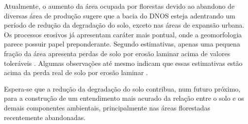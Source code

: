 Atualmente, o aumento da área ocupada por florestas devido ao abandono de diversas área de produção sugere que 
a bacia do DNOS esteja adentrando um período de redução da degradação do solo, exceto nas áreas de expansão 
urbana. Os processos erosivos já apresentam caráter mais pontual, onde a geomorfologia parece possuir papel 
preponderante. Segundo estimativas, apenas uma pequena fração da área apresenta perdas de solo por erosão 
laminar acima de valores toleráveis \cite{Miguel2010}. Algumas observações até mesmo indicam que essas 
estimativas estão acima da perda real de solo por erosão laminar \cite{MouraBueno2012}.


Espera-se que a redução da degradação do solo contribua, num futuro próximo, para a construção de um 
entendimento mais acurado da relação entre o solo e os demais componentes ambientais, principalmente nas áreas 
florestadas recentemente abandonadas.
